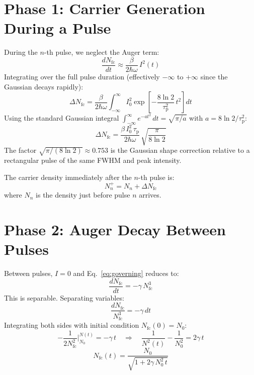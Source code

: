 \documentclass[11pt,a4paper]{article}
\begin{document}
\section{Phase 1: Carrier Generation During a Pulse}

During the $n$-th pulse, we neglect the Auger term:
\begin{equation}
\frac{dN_\text{fc}}{dt} \approx \frac{\beta}{2\hbar\omega}\,I^2(t)
\label{eq:generation}
\end{equation}
Integrating over the full pulse duration (effectively $-\infty$ to $+\infty$ since the Gaussian decays rapidly):
\begin{equation}
\Delta N_\text{fc} = \frac{\beta}{2\hbar\omega} \int_{-\infty}^{\infty} I_0^2 \exp\!\left[-\frac{8\ln 2}{\tau_\text{p}^2}\,t^2\right] dt
\label{eq:deltaN_integral}
\end{equation}
Using the standard Gaussian integral $\int_{-\infty}^{\infty} e^{-at^2}\,dt = \sqrt{\pi/a}$ with $a = 8\ln 2 / \tau_\text{p}^2$:
\begin{equation}
\boxed{\Delta N_\text{fc} = \frac{\beta\,I_0^2\,\tau_\text{p}}{2\hbar\omega}\,\sqrt{\frac{\pi}{8\ln 2}}}
\label{eq:deltaN}
\end{equation}
The factor $\sqrt{\pi/(8\ln 2)} \approx 0.753$ is the Gaussian shape correction relative to a rectangular pulse of the same FWHM and peak intensity.

The carrier density immediately after the $n$-th pulse is:
\begin{equation}
N_n^{+} = N_n + \Delta N_\text{fc}
\label{eq:after_pulse}
\end{equation}
where $N_n$ is the density just before pulse $n$ arrives.

\section{Phase 2: Auger Decay Between Pulses}

Between pulses, $I = 0$ and Eq.~\eqref{eq:governing} reduces to:
\begin{equation}
\frac{dN_\text{fc}}{dt} = -\gamma\,N_\text{fc}^3
\label{eq:auger_decay}
\end{equation}
This is separable. Separating variables:
\[
\frac{dN_\text{fc}}{N_\text{fc}^3} = -\gamma\,dt
\]
Integrating both sides with initial condition $N_\text{fc}(0) = N_0$:
\[
-\frac{1}{2N_\text{fc}^2}\bigg|_{N_0}^{N(t)} = -\gamma\,t
\quad\Longrightarrow\quad
\frac{1}{N^2(t)} - \frac{1}{N_0^2} = 2\gamma\,t
\]
\begin{equation}
\boxed{N_\text{fc}(t) = \frac{N_0}{\sqrt{1 + 2\gamma\,N_0^2\,t}}}
\label{eq:auger_solution}
\end{equation}
\end{document}
